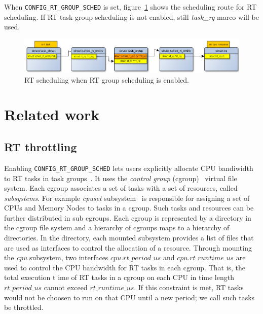 When \texttt{CONFIG\_RT\_GROUP\_SCHED} is set, figure~\ref{fig:rt_routing_tg} 
shows the scheduling route for RT scheduling. If RT task group scheduling is 
not enabled, still \emph{task\_rq} marco will be used.
\begin{figure}[htbp]
        \centering
        \includegraphics[width=\textwidth]{images/rt_scheduling_scheme_tg}
        \caption{RT scheduling when RT group scheduling is enabled.}
        \label{fig:rt_routing_tg}
\end{figure}

\section{Related work\label{sec:RelatedWork}}

\subsection{RT throttling\label{sec:RelatedWork_RT}}

Enabling \texttt{CONFIG\_RT\_GROUP\_SCHED} lets users explicitly allocate
CPU bandiwidth to RT tasks in task groups~\cite{rt-throttling}. It uses 
the \emph{control group} (cgroup)~\cite{cgroups} virtual file system. 
Each cgroup associates a set of tasks with a set of resources, 
called \emph{subsystems}. For example \emph{cpuset} 
subsystem~\cite{cpusets} is responsible for assigning a set of CPUs and 
Memory Nodes to tasks in a cgroup. Such tasks and resources can be further 
distributed in sub cgroups. Each cgroup is represented by a directory in 
the cgroup file system and a hierarchy of cgroups maps to a hierarchy of 
directories. In the directory, each mounted subsystem provides a list of 
files that are used as interfaces to control the allocation of a resource.
Through mounting the \emph{cpu} subsystem, two interfaces 
$cpu.rt\_period\_us$ and $cpu.rt\_runtime\_us$ are used to control the 
CPU bandwidth for RT tasks in each cgroup. That is, the total execution t
ime of RT tasks in a cgroup on each CPU in time length $rt\_period\_us$ 
cannot exceed $rt\_runtime\_us$. If this constraint is met, RT tasks would 
not be choosen to run on that CPU until a new period; we call such tasks be 
throttled.

